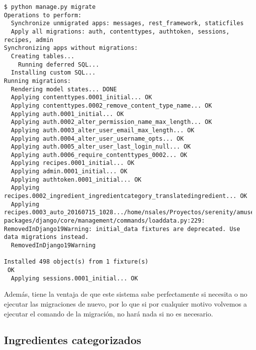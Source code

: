 \begin{verbatim}
$ python manage.py migrate                            
Operations to perform:
  Synchronize unmigrated apps: messages, rest_framework, staticfiles
  Apply all migrations: auth, contenttypes, authtoken, sessions, recipes, admin
Synchronizing apps without migrations:
  Creating tables...
    Running deferred SQL...
  Installing custom SQL...
Running migrations:
  Rendering model states... DONE
  Applying contenttypes.0001_initial... OK
  Applying contenttypes.0002_remove_content_type_name... OK
  Applying auth.0001_initial... OK
  Applying auth.0002_alter_permission_name_max_length... OK
  Applying auth.0003_alter_user_email_max_length... OK
  Applying auth.0004_alter_user_username_opts... OK
  Applying auth.0005_alter_user_last_login_null... OK
  Applying auth.0006_require_contenttypes_0002... OK
  Applying recipes.0001_initial... OK
  Applying admin.0001_initial... OK
  Applying authtoken.0001_initial... OK
  Applying recipes.0002_ingredient_ingredientcategory_translatedingredient... OK
  Applying recipes.0003_auto_20160715_1028.../home/nsales/Proyectos/serenity/amuseapi/env/lib/python3.4/site-packages/django/core/management/commands/loaddata.py:229: RemovedInDjango19Warning: initial_data fixtures are deprecated. Use data migrations instead.
  RemovedInDjango19Warning

Installed 498 object(s) from 1 fixture(s)
 OK
  Applying sessions.0001_initial... OK
\end{verbatim}

Además, tiene la ventaja de que este sistema sabe perfectamente si necesita o
no ejecutar las migraciones de nuevo, por lo que si por cualquier motivo
volvemos a ejecutar el comando de la migración, no hará nada si no es necesario.



\subsection{Ingredientes categorizados}


